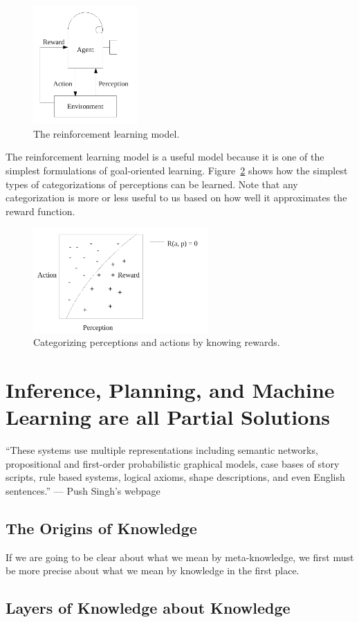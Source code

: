 \begin{figure}[bth]
  \center
  \includegraphics[width=4cm]{gfx/reinforcement_learning}
  \caption[The reinforcement learning model]{The reinforcement learning model.}
  \label{fig:reinforcement_learning}
\end{figure}

The reinforcement learning model is a useful model because it is one
of the simplest formulations of goal-oriented learning.
Figure~\ref{fig:perception_categorization} shows how the simplest
types of categorizations of perceptions can be learned.  Note that any
categorization is more or less useful to us based on how well it
approximates the reward function.

\begin{figure}[bth]
  \center
  \includegraphics[height=4cm]{gfx/perception_categorization}
  \caption[Categorizing perceptions and actions by knowing rewards]{Categorizing perceptions and actions by knowing rewards.}
  \label{fig:perception_categorization}
\end{figure}


\section{Inference, Planning, and Machine Learning are all Partial Solutions}

``These systems use multiple representations including semantic
networks, propositional and first-order probabilistic graphical
models, case bases of story scripts, rule based systems, logical
axioms, shape descriptions, and even English sentences.'' --- Push
Singh's webpage



\subsection{The Origins of Knowledge}

If we are going to be clear about what we mean by meta-knowledge, we
first must be more precise about what we mean by knowledge in the
first place.


\subsection{Layers of Knowledge about Knowledge}




